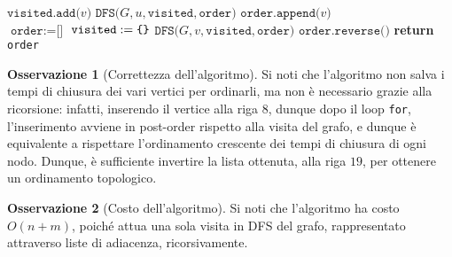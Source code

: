 \documentclass[14pt]{extreport}
\theoremstyle{definition}
\theoremstyle{definition}
\newtheorem{remark}{Osservazione}[subsection]
\begin{document}
\begin{algorithm}[H]
    \caption{
        Dato un grafo diretto aciclico connesso $G$, rappresentato attraverso liste di adiacenza in cui vengono salvati gli archi adiacenti uscenti, l'algoritmo restituisce un ordinamento topologico di $G$.\\
        \textbf{Input}: $G$ grafo diretto, rappresentato attraverso liste di adiacenza.\\
        \textbf{Output}: un ordinamento topologico di $G$.
    }

    \begin{algorithmic}[1]
            \State $\texttt{visited.add(}v\texttt{)}$
             
                    \State $\texttt{DFS(}G, u, \texttt{visited},\texttt{order)}$
                \EndIf
            \EndFor
            \State $\texttt{order.append(}v\texttt{)}$ 
        \EndFunction
        \\
            \State $\texttt{order} := \texttt{[]}$
            \State $\texttt{visited} := \verb|{|\verb|}|$
                    \State $\texttt{DFS(}G, v, \texttt{visited},\texttt{order)}$
                \EndIf
            \EndFor
            \State $\texttt{order.reverse()}$ 
            \State \textbf{return} \texttt{order}
        \EndFunction
    \end{algorithmic}
\end{algorithm}

\begin{remark}[Correttezza dell'algoritmo]
    Si noti che l'algoritmo non salva i tempi di chiusura dei vari vertici per ordinarli, ma non è necessario grazie alla ricorsione: infatti, inserendo il vertice alla riga $8$, dunque dopo il loop \texttt{for}, l'inserimento avviene in post-order rispetto alla visita del grafo, e dunque è equivalente a rispettare l'ordinamento crescente dei tempi di chiusura di ogni nodo. Dunque, è sufficiente invertire la lista ottenuta, alla riga $19$, per ottenere un ordinamento topologico.
\end{remark}

\begin{remark}[Costo dell'algoritmo]
    Si noti che l'algoritmo ha costo $O(n + m)$, poiché attua una sola visita in DFS del grafo, rappresentato attraverso liste di adiacenza, ricorsivamente.
\end{remark}
\end{document}
